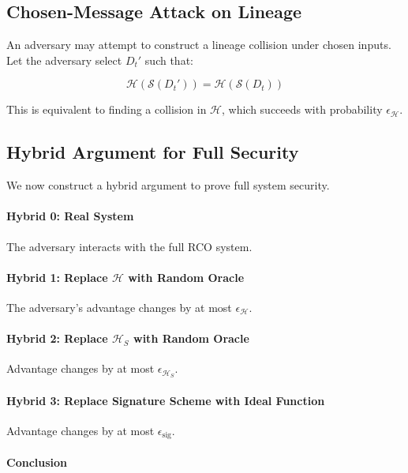 \subsection{Chosen-Message Attack on Lineage}

An adversary may attempt to construct a lineage collision under chosen inputs. Let the adversary select $D_t'$ such that:

\begin{equation}
\mathcal{H}(\mathcal{S}(D_t')) = \mathcal{H}(\mathcal{S}(D_t))
\end{equation}

This is equivalent to finding a collision in $\mathcal{H}$, which succeeds with probability $\epsilon_{\mathcal{H}}$.

\subsection{Hybrid Argument for Full Security}

We now construct a hybrid argument to prove full system security.

\paragraph{Hybrid 0: Real System}

The adversary interacts with the full RCO system.

\paragraph{Hybrid 1: Replace $\mathcal{H}$ with Random Oracle}

The adversary’s advantage changes by at most $\epsilon_{\mathcal{H}}$.

\paragraph{Hybrid 2: Replace $\mathcal{H}_S$ with Random Oracle}

Advantage changes by at most $\epsilon_{\mathcal{H}_S}$.

\paragraph{Hybrid 3: Replace Signature Scheme with Ideal Function}

Advantage changes by at most $\epsilon_{\text{sig}}$.

\paragraph{Conclusion}

